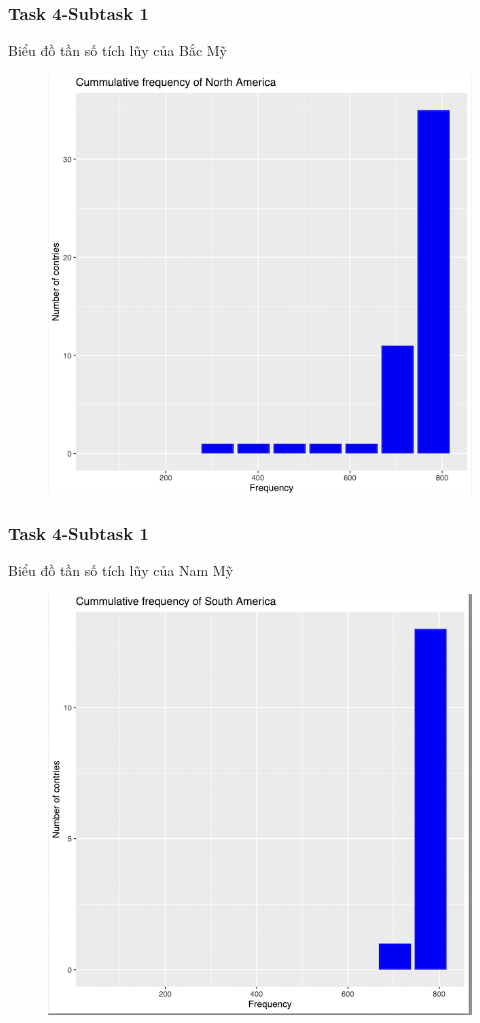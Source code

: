 \documentclass[english,10pt,table]{beamer}
\begin{document}
\frame
{
    \frametitle{Task 4-Subtask 1}
    \begin{block}{Biểu đồ tần số tích lũy của Bắc Mỹ}
    \begin{figure}
        \centering
        \includegraphics[scale=0.6]{images/4.1.4.png}
    \end{figure}
    \end{block}
}
{
    \frametitle{Task 4-Subtask 1}
    \begin{block}{Biểu đồ tần số tích lũy của Nam Mỹ}
    \begin{figure}
        \centering
        \includegraphics[scale=0.6]{images/4.1.5.png}
    \end{figure}
    \end{block}
}
\end{document}
